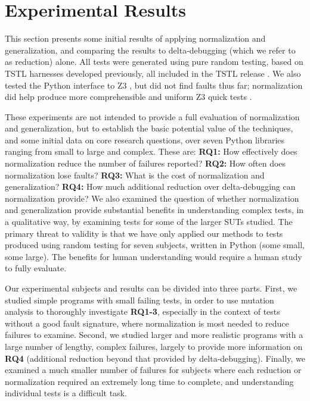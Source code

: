 \section {Experimental Results}

This section presents some initial results of applying normalization
and generalization, and comparing the results to delta-debugging 
(which we refer to as reduction) alone.  All tests were generated using pure random testing,
based on TSTL harnesses developed previously, all included in the
TSTL release \cite{tstl}.  We also tested the
Python interface to Z3 \cite{z3}, but did not find faults thus far;
normalization did help produce more comprehensible and uniform Z3
quick tests \cite{icst2014}.

These experiments are not intended to provide a full evaluation of
normalization and generalization, but to establish the basic potential
value of
the techniques, and some initial data on core research questions, over
seven Python libraries ranging from small to large and complex.
These are:
{\bf RQ1:} How effectively does normalization reduce the number of
failures reported? {\bf RQ2:} How often does normalization lose
faults? {\bf RQ3:} What is the cost of normalization and generalization? {\bf RQ4:} How
much additional reduction over delta-debugging can normalization
provide? We also examined the question of whether normalization and generalization provide
substantial benefits in understanding complex tests, in a qualitative
way, by examining tests for some of the larger SUTs studied.
The primary
threat to validity is that we have only applied our methods  to tests produced using random testing for 
seven subjects, written in Python (some small, some large).  The
benefits for human understanding would require a human study to fully evaluate.

Our experimental subjects and results can be divided into three parts.  First, we studied simple programs
with small failing tests, in order to use mutation analysis to
thoroughly investigate {\bf RQ1-3}, especially in the context of tests
without a good fault signature, where normalization is most needed to
reduce failures to examine.  Second, we studied
larger and more realistic programs with a large number of lengthy,
complex failures, largely
to provide more information on {\bf RQ4} (additional reduction beyond
that provided by delta-debugging).  Finally, we examined a much smaller
number of failures for subjects where each reduction or normalization
required an extremely long time to complete, and understanding
individual tests is a difficult task.

